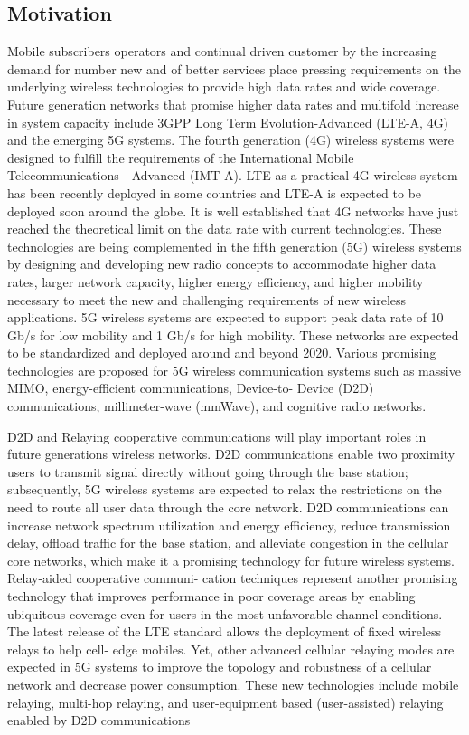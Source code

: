 \subsection{Motivation}
Mobile subscribers operators and continual driven customer by the increasing demand for number new and
 of
better services place pressing requirements on the underlying
wireless technologies to provide high data rates and wide
coverage. Future generation networks that promise higher data
rates and multifold increase in system capacity include 3GPP
Long Term Evolution-Advanced (LTE-A, 4G) and the emerging 5G systems. The fourth generation (4G) wireless systems were designed to fulfill the requirements of the International Mobile Telecommunications - Advanced (IMT-A). LTE as
a practical 4G wireless system has been recently deployed
in some countries and LTE-A is expected to be deployed
soon around the globe. It is well established that 4G
networks have just reached the theoretical limit on the data
rate with current technologies. These technologies are being
complemented in the fifth generation (5G) wireless systems
by designing and developing new radio concepts to accommodate higher data rates, larger network capacity, higher energy efficiency, and higher mobility necessary to meet the new and challenging requirements of new wireless applications.
5G wireless systems are expected to support peak data rate
of 10 Gb/s for low mobility and 1 Gb/s for high mobility.
These networks are expected to be standardized and deployed around and beyond 2020. Various promising technologies are
proposed for 5G wireless communication systems such as
massive MIMO, energy-efficient communications, Device-to-
Device (D2D) communications, millimeter-wave (mmWave),
and cognitive radio networks.
\par 
D2D and Relaying cooperative communications will play
important roles in future generations wireless networks. D2D
communications enable two proximity users to transmit signal
directly without going through the base station; subsequently,
5G wireless systems are expected to relax the restrictions on
the need to route all user data through the core network. D2D
communications can increase network spectrum utilization and
energy efficiency, reduce transmission delay, offload traffic for
the base station, and alleviate congestion in the cellular core
networks, which make it a promising technology for future
wireless systems. Relay-aided cooperative communi-
cation techniques represent another promising technology that
improves performance in poor coverage areas by enabling
ubiquitous coverage even for users in the most unfavorable
channel conditions. The latest release of the LTE standard
allows the deployment of fixed wireless relays to help cell-
edge mobiles. Yet, other advanced cellular relaying modes are
expected in 5G systems to improve the topology and robustness
of a cellular network and decrease power consumption. These
new technologies include mobile relaying, multi-hop relaying,
and user-equipment based (user-assisted) relaying enabled by
D2D communications 

